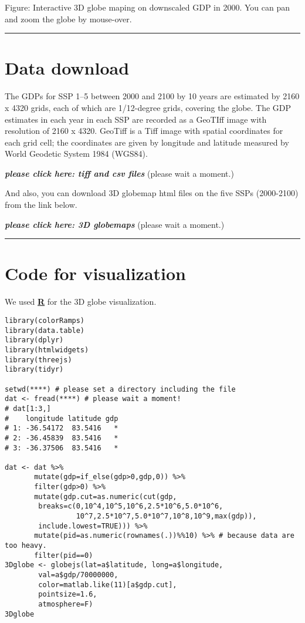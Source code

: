 \documentclass[]{book}
\begin{document}
\hypertarget{e1PFKEa1JQ}{}

Figure: Interactive 3D globe maping on downscaled GDP in 2000. You can pan and zoom the globe by mouse-over.

\begin{center}\rule{0.5\linewidth}{\linethickness}\end{center}

\hypertarget{data-download}{%
\section*{Data download}\label{data-download}}

The GDPs for SSP 1--5 between 2000 and 2100 by 10 years are estimated by 2160 x 4320 grids, each of which are 1/12-degree grids, covering the globe. The GDP estimates in each year in each SSP are recorded as a GeoTIff image with resolution of 2160 x 4320. GeoTiff is a Tiff image with spatial coordinates for each grid cell; the coordinates are given by longitude and latitude measured by World Geodetic System 1984 (WGS84).

\textbf{\emph{please click here: tiff and csv files}} (please wait a moment.)

And also, you can download 3D globemap html files on the five SSPs (2000-2100) from the link below.

\textbf{\emph{please click here: 3D globemaps}} (please wait a moment.)

\begin{center}\rule{0.5\linewidth}{\linethickness}\end{center}

\hypertarget{code-for-visualization}{%
\section*{Code for visualization}\label{code-for-visualization}}

We used \href{https://www.r-project.org/}{\textbf{R}} for the 3D globe visualization.

\begin{verbatim}
library(colorRamps)
library(data.table)
library(dplyr)
library(htmlwidgets)
library(threejs)
library(tidyr)

setwd(****) # please set a directory including the file
dat <- fread(****) # please wait a moment!
# dat[1:3,]
#    longitude latitude gdp
# 1: -36.54172  83.5416   *
# 2: -36.45839  83.5416   *
# 3: -36.37506  83.5416   *

dat <- dat %>%
       mutate(gdp=if_else(gdp>0,gdp,0)) %>%
       filter(gdp>0) %>%
       mutate(gdp.cut=as.numeric(cut(gdp,
        breaks=c(0,10^4,10^5,10^6,2.5*10^6,5.0*10^6,
                 10^7,2.5*10^7,5.0*10^7,10^8,10^9,max(gdp)), 
        include.lowest=TRUE))) %>%
       mutate(pid=as.numeric(rownames(.))%%10) %>% # because data are too heavy.
       filter(pid==0)
3Dglobe <- globejs(lat=a$latitude, long=a$longitude,
        val=a$gdp/70000000,
        color=matlab.like(11)[a$gdp.cut],
        pointsize=1.6,
        atmosphere=F)
3Dglobe        
\end{verbatim}
\end{document}
